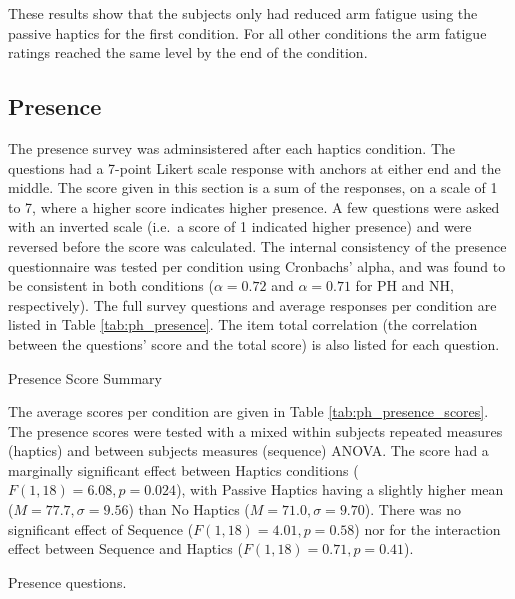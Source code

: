 These results show that the subjects only had reduced arm fatigue using the passive haptics for the first condition.
For all other conditions the arm fatigue ratings reached the same level by the end of the condition.

\subsection{Presence}


The presence survey was adminsistered after each haptics condition.
The questions had a 7-point Likert scale response with anchors at either end and the middle.
The score given in this section is a sum of the responses, on a scale of 1 to 7, where a higher score indicates higher presence.
A few questions were asked with an inverted scale (i.e.\ a score of 1 indicated higher presence) and were reversed before the score was calculated.
The internal consistency of the presence questionnaire was tested per condition using Cronbachs' alpha, and was found to be consistent in both conditions ($\alpha=0.72$ and $\alpha=0.71$ for PH and NH, respectively).
The full survey questions and average responses per condition are listed in Table \ref{tab:ph_presence}.
The item total correlation (the correlation between the questions' score and the total score) is also listed for each question.

\begin{table}
    \centering
    \caption{Presence Score Summary}
    \label{tab:ph_presence_scores}
\end{table}

The average scores per condition are given in Table \ref{tab:ph_presence_scores}.
The presence scores were tested with a mixed within subjects repeated measures (haptics) and between subjects measures (sequence) ANOVA.
The score had a marginally significant effect between Haptics conditions ($F(1,18)=6.08, p=0.024$), with Passive Haptics having a slightly higher mean ($M=77.7, \sigma=9.56$) than No Haptics ($M=71.0, \sigma=9.70$).
There was no significant effect of Sequence ($F(1,18)=4.01, p=0.58$) nor for the interaction effect between Sequence and Haptics ($F(1,18)=0.71, p=0.41$).

\begin{table}
    \centering
    \caption{Presence questions.}
    \label{tab:ph_presence}
\end{table}


